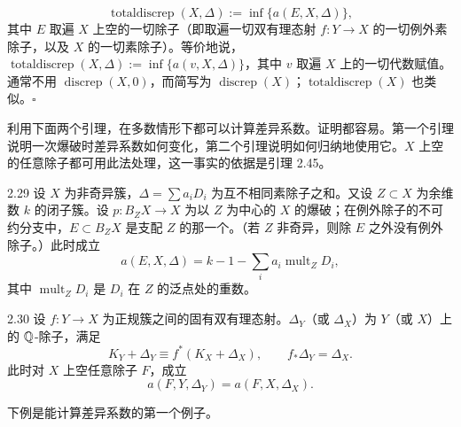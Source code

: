 \[
\operatorname{totaldiscrep}(X,\Delta):=\inf\{a(E,X,\Delta)\},
\]
其中 $E$ 取遍 $X$ 上空的一切除子（即取遍一切双有理态射 $f\colon Y\to X$ 的一切例外素除子，以及 $X$ 的一切素除子）。等价地说，$\operatorname{totaldiscrep}(X,\Delta):=\inf\{a(v,X,\Delta)\}$，其中 $v$ 取遍 $X$ 上的一切代数赋值。
通常不用 $\operatorname{discrep}(X,0)$，而简写为 $\operatorname{discrep}(X)$；$\operatorname{totaldiscrep}(X)$ 也类似。\hfill$\square$

利用下面两个引理，在多数情形下都可以计算差异系数。证明都容易。第一个引理说明一次爆破时差异系数如何变化，第二个引理说明如何归纳地使用它。$X$ 上空的任意除子都可用此法处理，这一事实的依据是引理 2.45。

\begin{lemma}{2.29}
设 $X$ 为非奇异簇，$\Delta=\sum a_iD_i$ 为互不相同素除子之和。又设 $Z\subset X$ 为余维数 $k$ 的闭子簇。设 $p\colon B_ZX\to X$ 为以 $Z$ 为中心的 $X$ 的爆破；在例外除子的不可约分支中，$E\subset B_ZX$ 是支配 $Z$ 的那一个。（若 $Z$ 非奇异，则除 $E$ 之外没有例外除子。）此时成立
\[
a(E,X,\Delta)=k-1-\sum_i a_i\operatorname{mult}_ZD_i,
\]
其中 $\operatorname{mult}_ZD_i$ 是 $D_i$ 在 $Z$ 的泛点处的重数。
\end{lemma}

\begin{lemma}{2.30}
设 $f\colon Y\to X$ 为正规簇之间的固有双有理态射。$\Delta_Y$（或 $\Delta_X$）为 $Y$（或 $X$）上的 $\mathbb{Q}$-除子，满足
\[
K_Y+\Delta_Y\equiv f^*(K_X+\Delta_X),\qquad f_*\Delta_Y=\Delta_X.
\]
此时对 $X$ 上空任意除子 $F$，成立
\[
a(F,Y,\Delta_Y)=a(F,X,\Delta_X).
\]
\end{lemma}

下例是能计算差异系数的第一个例子。

